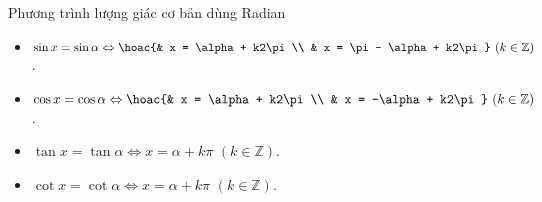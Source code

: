 \begin{dang}{Phương trình lượng giác cơ bản dùng Radian}
	\begin{itemize}
		\item  $\sin x = \sin \alpha \Leftrightarrow \hoac{& x = \alpha + k2\pi \\ & x = \pi - \alpha + k2\pi} \,\, (k \in \mathbb{Z})$.
		\item $\cos x = \cos \alpha  \Leftrightarrow \hoac{& x = \alpha + k2\pi \\ & x = -\alpha + k2\pi} \,\, (k \in \mathbb{Z})$.
		\item $\tan x = \tan \alpha \Leftrightarrow x = \alpha + k\pi \,\, (k \in \mathbb{Z})$.
		\item $\cot x = \cot \alpha   \Leftrightarrow x = \alpha + k\pi \,\, (k \in \mathbb{Z})$.
	\end{itemize}
\end{dang}
